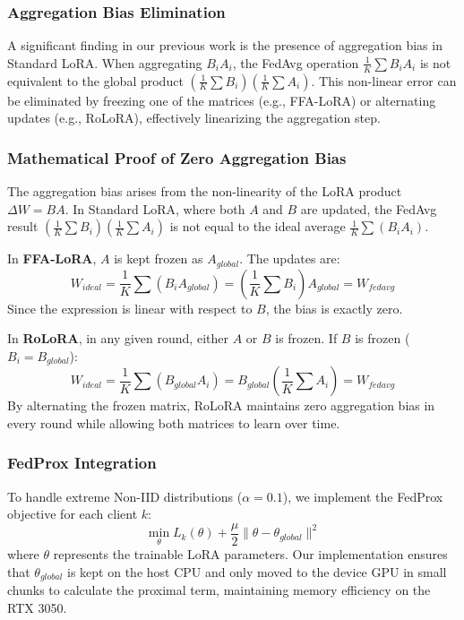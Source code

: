 \documentclass[twocolumn]{article}
\begin{document}
\subsubsection{Aggregation Bias Elimination}
A significant finding in our previous work is the presence of aggregation bias in Standard LoRA. When aggregating $B_i A_i$, the FedAvg operation $\frac{1}{K} \sum B_i A_i$ is not equivalent to the global product $(\frac{1}{K} \sum B_i)(\frac{1}{K} \sum A_i)$. This non-linear error can be eliminated by freezing one of the matrices (e.g., FFA-LoRA) or alternating updates (e.g., RoLoRA), effectively linearizing the aggregation step.

\subsubsection{Mathematical Proof of Zero Aggregation Bias}
The aggregation bias arises from the non-linearity of the LoRA product $\Delta W = BA$. In Standard LoRA, where both $A$ and $B$ are updated, the FedAvg result $(\frac{1}{K} \sum B_i)(\frac{1}{K} \sum A_i)$ is not equal to the ideal average $\frac{1}{K} \sum (B_i A_i)$.

In \textbf{FFA-LoRA}, $A$ is kept frozen as $A_{global}$. The updates are:
\begin{equation}
    W_{ideal} = \frac{1}{K} \sum (B_i A_{global}) = \left(\frac{1}{K} \sum B_i\right) A_{global} = W_{fedavg}
\end{equation}
Since the expression is linear with respect to $B$, the bias is exactly zero.

In \textbf{RoLoRA}, in any given round, either $A$ or $B$ is frozen. If $B$ is frozen ($B_i = B_{global}$):
\begin{equation}
    W_{ideal} = \frac{1}{K} \sum (B_{global} A_i) = B_{global} \left(\frac{1}{K} \sum A_i\right) = W_{fedavg}
\end{equation}
By alternating the frozen matrix, RoLoRA maintains zero aggregation bias in every round while allowing both matrices to learn over time.

\subsubsection{FedProx Integration}
To handle extreme Non-IID distributions ($\alpha=0.1$), we implement the FedProx objective for each client $k$:
\begin{equation}
    \min_{\theta} L_k(\theta) + \frac{\mu}{2} \|\theta - \theta_{global}\|^2
\end{equation}
where $\theta$ represents the trainable LoRA parameters. Our implementation ensures that $\theta_{global}$ is kept on the host CPU and only moved to the device GPU in small chunks to calculate the proximal term, maintaining memory efficiency on the RTX 3050.
\end{document}

